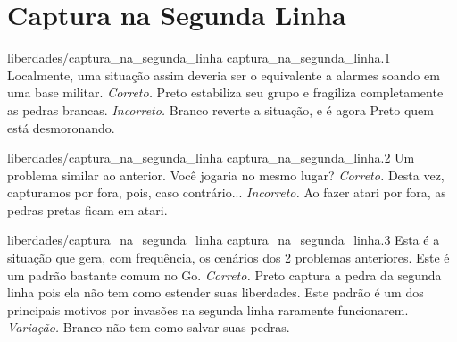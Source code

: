 \chapter{Captura na Segunda Linha}

\emptypage

\problemAnswerDiagram
  {liberdades/captura_na_segunda_linha}
  {captura_na_segunda_linha.1}
  {Localmente, uma situação assim deveria ser o equivalente a alarmes soando em uma base militar.}
  {\emph{Correto.} Preto estabiliza seu grupo e fragiliza completamente as pedras brancas.}
  {\emph{Incorreto.} Branco reverte a situação, e é agora Preto quem está desmoronando.}

\problemAnswerDiagram
  {liberdades/captura_na_segunda_linha}
  {captura_na_segunda_linha.2}
  {Um problema similar ao anterior. Você jogaria no mesmo lugar?}
  {\emph{Correto.} Desta vez, capturamos por fora, pois, caso contrário...}
  {\emph{Incorreto.} Ao fazer atari por fora, as pedras pretas ficam em atari.}

\problemAnswerDiagram
  {liberdades/captura_na_segunda_linha}
  {captura_na_segunda_linha.3}
  {Esta é a situação que gera, com frequência, os cenários dos 2 problemas anteriores. Este é um padrão bastante comum no Go.}
  {\emph{Correto.} Preto captura a pedra da segunda linha pois ela não tem como estender suas liberdades. Este padrão é um dos principais motivos por invasões na segunda linha raramente funcionarem.}
  {\emph{Variação.} Branco não tem como salvar suas pedras.}

\clearedpage
\clearedpage
